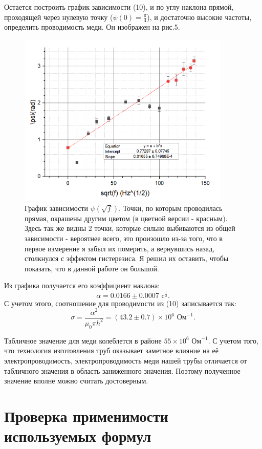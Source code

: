 \documentclass[a4paper, 14pt]{extarticle}%
\newcommand\ECaption[1]{%
     \captionsetup{font=footnotesize}%
     \caption{#1}}
\begin{document}
Остается построить график зависимости (10), и по углу наклона прямой, проходящей через нулевую точку ($\psi(0) = \frac{\pi}{4}$), и достаточно высокие частоты, определить проводимость меди. Он изображен на рис.5.

\begin{figure}[h!]
\begin{center}
\includegraphics[width=0.9\textwidth]{f}
\end{center}
\ECaption{График зависимости $\psi(\sqrt{f})$. Точки, по которым проводилась прямая, окрашены другим цветом (в цветной версии - красным). Здесь так же видны 2 точки, которые сильно выбиваются из общей зависимости - вероятнее всего, это произошло из-за того, что в первое измерение я забыл их померить, а вернувшись назад, столкнулся с эффектом гистерезиса. Я решил их оставить, чтобы показать, что в данной работе он большой. }
\end{figure}

Из графика получается его коэффициент наклона:
\[\alpha = 0.0166\pm0.0007 \text{ c}^{\frac{1}{2}}.\]
С учетом этого, соотношение для проводимости из (10) записывается так:
\[\sigma = \dfrac{\alpha^2}{\mu_0\pi h^2} = (43.2 \pm 0.7)\times 10^6 \text{ Ом}^{-1}.\]

Табличное значение для меди колеблется в районе $55\times 10^6 \text{ Ом}^{-1}$. С учетом того, что технология изготовления труб оказывает заметное
влияние на её электропроводимость, электропроводимость меди нашей трубы отличается от табличного значения в область заниженного значения. Поэтому полученное значение вполне можно считать достоверным.
 
\section*{Проверка применимости используемых формул}
\end{document}
